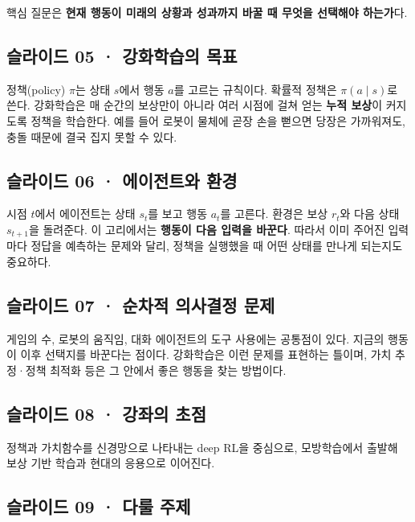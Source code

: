 \documentclass[11pt,a4paper]{article}
\begin{document}
핵심 질문은 \textbf{현재 행동이 미래의 상황과 성과까지 바꿀 때 무엇을 선택해야 하는가}다.\par

\subsection{슬라이드 05 · 강화학습의 목표}

정책(policy) $\pi$는 상태 $s$에서 행동 $a$를 고르는 규칙이다. 확률적 정책은 $\pi(a\mid s)$로 쓴다. 강화학습은 매 순간의 보상만이 아니라 여러 시점에 걸쳐 얻는 \textbf{누적 보상}이 커지도록 정책을 학습한다. 예를 들어 로봇이 물체에 곧장 손을 뻗으면 당장은 가까워져도, 충돌 때문에 결국 집지 못할 수 있다.\par

\subsection{슬라이드 06 · 에이전트와 환경}

시점 $t$에서 에이전트는 상태 $s_t$를 보고 행동 $a_t$를 고른다. 환경은 보상 $r_t$와 다음 상태 $s_{t+1}$을 돌려준다. 이 고리에서는 \textbf{행동이 다음 입력을 바꾼다}. 따라서 이미 주어진 입력마다 정답을 예측하는 문제와 달리, 정책을 실행했을 때 어떤 상태를 만나게 되는지도 중요하다.\par

\subsection{슬라이드 07 · 순차적 의사결정 문제}

게임의 수, 로봇의 움직임, 대화 에이전트의 도구 사용에는 공통점이 있다. 지금의 행동이 이후 선택지를 바꾼다는 점이다. 강화학습은 이런 문제를 표현하는 틀이며, 가치 추정·정책 최적화 등은 그 안에서 좋은 행동을 찾는 방법이다.\par

\subsection{슬라이드 08 · 강좌의 초점}

정책과 가치함수를 신경망으로 나타내는 deep RL을 중심으로, 모방학습에서 출발해 보상 기반 학습과 현대의 응용으로 이어진다.\par

\subsection{슬라이드 09 · 다룰 주제}
\end{document}
